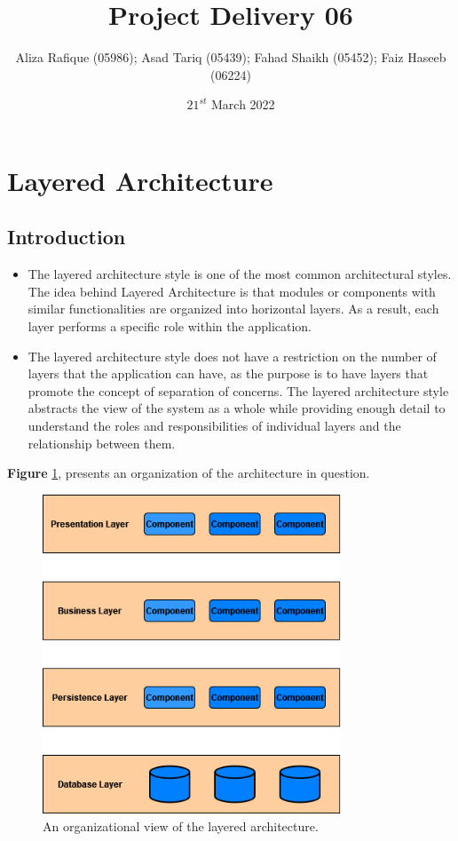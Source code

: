 \documentclass[11pt]{extarticle}
\title{\textbf{Project Delivery 06}}
\author{Aliza Rafique (05986); Asad Tariq (05439); Fahad Shaikh (05452); Faiz Haseeb (06224)}
\date{$21^{st}$ March 2022}
\begin{document}

\newpage
\thispagestyle{empty}
\tableofcontents
\hypersetup{linkcolor=blue}
\newpage
\pagestyle{plain}

\section{Layered Architecture}

\subsection{Introduction}
\begin{itemize}
    \item The layered architecture style is one of the most common architectural styles. The idea behind
    Layered Architecture is that modules or components with similar functionalities are
    organized into horizontal layers. As a result, each layer performs a specific role within the
    application.
    \item The layered architecture style does not have a restriction on the number of layers that the
    application can have, as the purpose is to have layers that promote the concept of separation of
    concerns. The layered architecture style abstracts the view of the system as a whole while
    providing enough detail to understand the roles and responsibilities of individual layers and
    the relationship between them.
\end{itemize}
\textbf{Figure} \ref{archiView}, presents an organization of the architecture in question.

\begin{figure}[H]
    \centering
    \includegraphics[width=3.5in]{Figures/layered_view_top.png}
    \caption{An organizational view of the layered architecture.}
    \label{archiView}
\end{figure}
\end{document}
